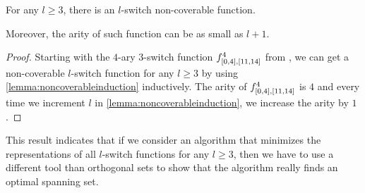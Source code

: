 \begin{theorem}
For any $l \geq 3$,
there is an $l$-switch non-coverable function.

Moreover, the arity of such function can be as small as
$l+1$.
\end{theorem}

\begin{proof}
Starting with the $4$-ary
$3$-switch function $f^{4}_{[0, 4], [11, 14]}$ from \citet{Dubovsky2012},
we can get a non-coverable $l$-switch function for any $l \geq 3$
by using \cref{lemma:noncoverableinduction} inductively.
The arity of $f^{4}_{[0, 4], [11, 14]}$ is $4$
and every time we increment $l$ in \cref{lemma:noncoverableinduction},
we increase the arity by $1$.
\end{proof}

This result indicates that
if we consider an algorithm that minimizes the representations of all $l$-switch functions for any $l \geq 3$,
then we have to use a different tool than orthogonal sets to show that the algorithm really finds an optimal spanning set.

